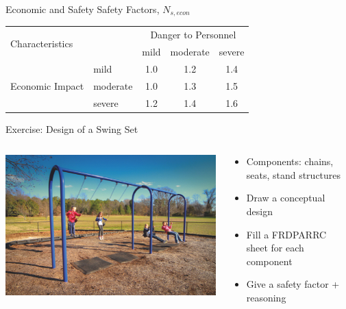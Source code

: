 \documentclass[10pt, svgnames]{beamer}
\begin{document}
\begin{frame}[label={sec:org5cdc3f6}]{Economic and Safety Safety Factors, \(N_{s,econ}\)}
\begin{table}[h]
  \centering
  \begin{tabular}{llccc}
    \toprule
    \multicolumn{2}{l}{\multirow{2}{2.5cm}{Characteristics}} & \multicolumn{3}{c}{Danger to Personnel} \\
    \cmidrule{3-5}
                                                           &          & mild & moderate & severe \\
    \midrule
    \multirow{3}{3cm}{Economic Impact} & mild     & 1.0  & 1.2      & 1.4    \\
                                                           & moderate & 1.0  & 1.3      & 1.5    \\
                                                           & severe   & 1.2  & 1.4      & 1.6    \\
    \bottomrule
  \end{tabular}
\end{table}
\end{frame}

\begin{frame}[label={sec:org8cb81f1}]{Exercise: Design of a Swing Set}
\begin{columns}
\begin{column}{0.5\columnwidth}
\begin{center}
\includegraphics[width=\textwidth]{./pictures/swing-set.jpg}
\end{center}
\end{column}

\begin{column}{0.5\columnwidth}
\begin{itemize}
\item Components: chains, seats, stand structures
\item Draw a conceptual design
\item Fill a FRDPARRC sheet for each component
\item Give a safety factor + reasoning
\end{itemize}
\end{column}
\end{columns}
\end{frame}
\end{document}
